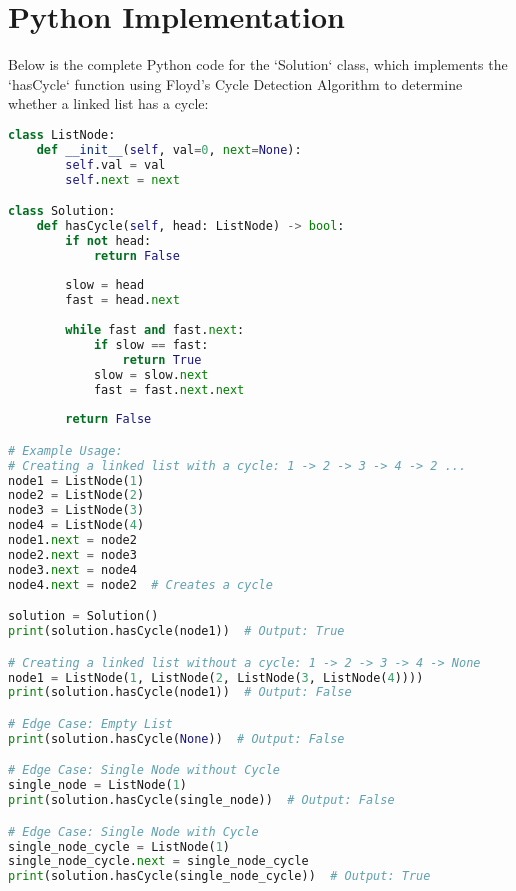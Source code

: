 \newpage %
\section*{Python Implementation}

Below is the complete Python code for the `Solution` class, which implements the `hasCycle` function using Floyd's Cycle Detection Algorithm to determine whether a linked list has a cycle:

\begin{fullwidth}
\begin{lstlisting}[language=Python]
class ListNode:
    def __init__(self, val=0, next=None):
        self.val = val
        self.next = next

class Solution:
    def hasCycle(self, head: ListNode) -> bool:
        if not head:
            return False
            
        slow = head
        fast = head.next
        
        while fast and fast.next:
            if slow == fast:
                return True
            slow = slow.next
            fast = fast.next.next
        
        return False

# Example Usage:
# Creating a linked list with a cycle: 1 -> 2 -> 3 -> 4 -> 2 ...
node1 = ListNode(1)
node2 = ListNode(2)
node3 = ListNode(3)
node4 = ListNode(4)
node1.next = node2
node2.next = node3
node3.next = node4
node4.next = node2  # Creates a cycle

solution = Solution()
print(solution.hasCycle(node1))  # Output: True

# Creating a linked list without a cycle: 1 -> 2 -> 3 -> 4 -> None
node1 = ListNode(1, ListNode(2, ListNode(3, ListNode(4))))
print(solution.hasCycle(node1))  # Output: False

# Edge Case: Empty List
print(solution.hasCycle(None))  # Output: False

# Edge Case: Single Node without Cycle
single_node = ListNode(1)
print(solution.hasCycle(single_node))  # Output: False

# Edge Case: Single Node with Cycle
single_node_cycle = ListNode(1)
single_node_cycle.next = single_node_cycle
print(solution.hasCycle(single_node_cycle))  # Output: True
\end{lstlisting}
\end{fullwidth}


